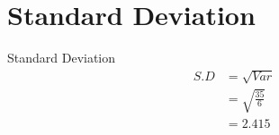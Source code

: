 \documentclass{beamer}
\begin{document}
\section{Standard Deviation}
\begin{frame}{Standard Deviation}
\begin{align}
    S.D &= \sqrt{Var}\\
    &= \sqrt{\frac{35}{6}}\\
    &= 2.415
\end{align}
\end{frame}
\end{document}
